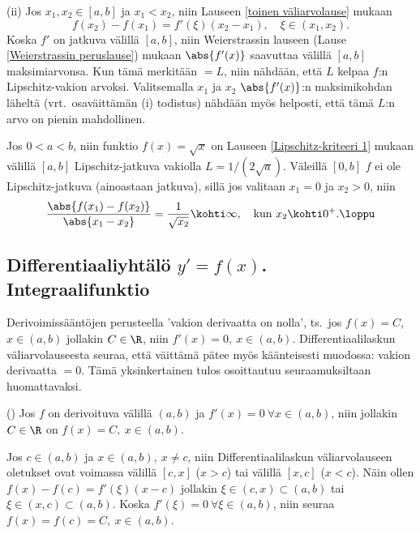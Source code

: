 (ii) Jos $x_1,x_2\in [a,b]$ ja $x_1<x_2$, niin Lauseen \ref{toinen väliarvolause} mukaan
\[
f(x_2)-f(x_1)=f'(\xi)(x_2-x_1),\quad \xi\in (x_1,x_2).
\]
Koska $f'$ on jatkuva välillä $[a,b]$, niin Weierstrassin lauseen (Lause
\ref{Weierstrassin peruslause}) mukaan $\abs{f'(x)}$ saavuttaa välillä $[a,b]$ maksimiarvonsa.
Kun tämä merkitään $=L$, niin nähdään, että $L$ kelpaa $f$:n Lipschitz-vakion arvoksi.
Valitsemalla $x_1$ ja $x_2$ $\abs{f'(x)}$:n maksimikohdan läheltä (vrt.\ osaväittämän (i)
todistus) nähdään myös helposti, että tämä $L$:n arvo on pienin mahdollinen. \loppu
\begin{Exa} Jos $0<a<b$, niin funktio $f(x)=\sqrt{x}$ on Lauseen \ref{Lipschitz-kriteeri 1}
mukaan välillä $[a,b]$ Lipschitz-jatkuva vakiolla $L=1/(2\sqrt{a})$. Väleillä $[0,b]$ $f$ ei
ole Lipschitz-jatkuva (ainoastaan jatkuva), sillä jos valitaan $x_1=0$ ja $x_2>0$, niin
\[
\frac{\abs{f(x_1)-f(x_2)}}{\abs{x_1-x_2}} = \frac{1}{\sqrt{x_2}} \kohti \infty, \quad
                                            \text{kun}\ x_2 \kohti 0^+. \loppu
\]
\end{Exa}

\subsection*{Differentiaaliyhtälö $y'=f(x)$. Integraalifunktio}
 

Derivoimissääntöjen perusteella 'vakion derivaatta on nolla', ts.\ jos $f(x)=C$, $x\in(a,b)$
jollakin $C\in\R$, niin $f'(x)=0,\ x\in(a,b)$. Differentiaalilaskun väli\-arvo\-lauseesta 
seuraa, että väittämä pätee myös käänteisesti muodossa:  vakion derivaatta $=0$. 
Tämä yksinkertainen tulos osoittautuu seuraamuksiltaan huomattavaksi.
\begin{Lause} () 
\label{Integraalilaskun peruslause} 
Jos $f$ on derivoituva välillä $(a,b)$ ja $f'(x)=0\ \forall x\in(a,b)$, niin jollakin $C\in\R$
on $f(x)=C,\ x\in(a,b)$.
\end{Lause}
\tod Jos $c\in(a,b)$ ja $x\in(a,b),\ x \neq c$, niin Differentiaalilaskun väliarvolauseen
oletukset ovat voimassa välillä $[c,x]$ ($x>c$) tai välillä $[x,c]$ ($x<c$). Näin ollen
$f(x)-f(c)=f'(\xi)(x-c)$ jollakin $\xi\in(c,x)\subset(a,b)$ tai $\xi\in(x,c)\subset(a,b)$.
Koska $f'(\xi)=0\ \forall\xi\in(a,b)$, niin seuraa $f(x)=f(c)=C,\ x\in(a,b)$. \loppu

